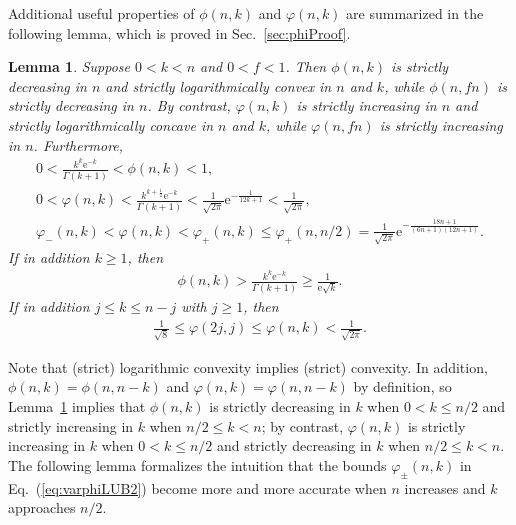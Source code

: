 \documentclass[aop]{imsart}
\theoremstyle{plain}
\newtheorem{lemma}[theorem]{Lemma}
\theoremstyle{remark}
\newcommand{\rme}{\mathrm{e}}
\newcommand{\1}{\operatorname{\uppercase\expandafter{\romannumeral1}}}
\newcommand{\2}{\operatorname{\uppercase\expandafter{\romannumeral2}}}
\newcommand{\3}{\operatorname{\uppercase\expandafter{\romannumeral3}}}
\newcommand{\4}{\operatorname{\uppercase\expandafter{\romannumeral4}}}
\newcommand{\5}{\operatorname{\uppercase\expandafter{\romannumeral5}}}
\newcommand{\6}{\operatorname{\uppercase\expandafter{\romannumeral6}}}
\newcommand{\7}{\operatorname{\uppercase\expandafter{\romannumeral7}}}
\newcommand{\8}{\operatorname{\uppercase\expandafter{\romannumeral8}}}
\newcommand{\9}{\operatorname{\uppercase\expandafter{\romannumeral9}}}
\newcommand{\eref}[1]{Eq.~\textup{(\ref{#1})}}
\newcommand{\lref}[1]{Lemma~\ref{#1}}
\newcommand{\sref}[1]{Sec.~\ref{#1}}
\begin{document}
Additional useful properties of $\phi(n,k)$ and $\varphi(n,k)$ are summarized in the following lemma, which is proved in \sref{sec:phiProof}.
\begin{lemma}\label{lem:phi}
	Suppose $0<k<n$ and $0<f<1$. Then $\phi(n,k)$ 	is  strictly decreasing in $n$  and strictly  logarithmically convex in $n$ and $k$, while  $\phi(n,f n)$ is strictly decreasing in $n$. By contrast,
	$\varphi(n,k)$ is strictly increasing in $n$ and	  strictly  logarithmically concave in $n$ and $k$, while  $\varphi(n,f n)$ is strictly increasing in $n$.
	Furthermore,
	\begin{gather}
	0<\frac{k^k \rme^{-k}}{\Gamma(k+1)}< \phi(n,k)<1, \label{eq:phiLUB}\\
	0<\varphi(n,k)<
	\frac{k^{k+\frac{1}{2}} \rme^{-k}}{\Gamma(k+1)}
	< \frac{1}{\sqrt{2\pi}}\rme^{-\frac{1}{12k+1}}<\frac{1}{\sqrt{2\pi}}, \label{eq:varphiLUB}\\
\varphi_-(n,k)< 
	\varphi(n,k)< \varphi_+(n,k)\leq \varphi_+(n,n/2)= \frac{1}{\sqrt{2\pi}}\rme^{-\frac{18n+1}{(6n+1)(12n+1)}}.	 \label{eq:varphiLUB2}
	\end{gather}
	If in addition $k\geq 1$, then
	\begin{align}
	\phi(n,k)> \frac{k^k \rme^{-k}}{\Gamma(k+1)}\geq \frac{1}{\rme\sqrt{k}}. \label{eq:phiLB2}
	\end{align}
	If in addition $j\leq k\leq n-j$ with $j\geq 1$, then
	\begin{align}
	\frac{1}{\sqrt{8}}\leq \varphi(2j,j)\leq  \varphi(n,k)<\frac{1}{\sqrt{2\pi}}. \label{eq:varphiLUB4}
	\end{align}
\end{lemma}
Note that (strict) logarithmic convexity implies (strict) convexity. In addition,
$\phi(n,k)=\phi(n,n-k)$ and $\varphi(n,k)=\varphi(n,n-k)$ by definition, so  \lref{lem:phi} implies that
$\phi(n,k)$ is strictly decreasing in $k$ when $0<k\leq n/2$ and strictly increasing in $k$ when $n/2\leq k<n$; by contrast, $\varphi(n,k)$ is strictly increasing in $k$ when $0<k\leq n/2$ and strictly decreasing in $k$ when $n/2\leq k<n$. 
The following lemma formalizes the intuition that the bounds $\varphi_\pm(n,k)$ in \eref{eq:varphiLUB2} become more and more accurate when $n$ increases and $k$ approaches $n/2$. 
\end{document}
